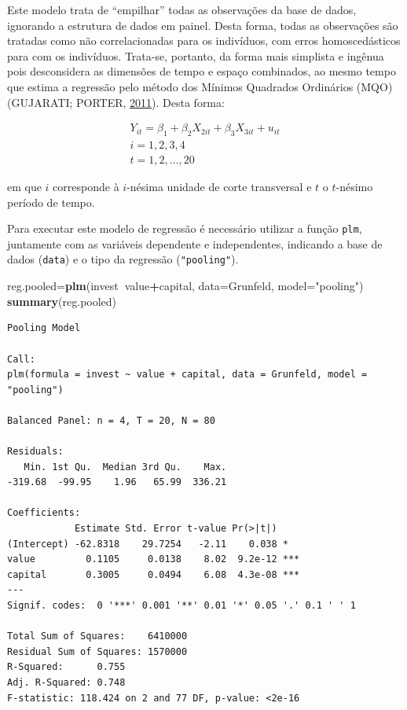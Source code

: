 \documentclass[12pt,brazil,oneside]{book}
\newenvironment{Shaded}{\begin{snugshade}}{\end{snugshade}}
\newcommand{\DataTypeTok}[1]{\textcolor[rgb]{0.13,0.29,0.53}{#1}}
\newcommand{\KeywordTok}[1]{\textcolor[rgb]{0.13,0.29,0.53}{\textbf{#1}}}
\newcommand{\NormalTok}[1]{#1}
\newcommand{\OperatorTok}[1]{\textcolor[rgb]{0.81,0.36,0.00}{\textbf{#1}}}
\newcommand{\StringTok}[1]{\textcolor[rgb]{0.31,0.60,0.02}{#1}}
\begin{document}
Este modelo trata de ``empilhar'' todas as observações da base de dados, ignorando a estrutura de dados em painel. Desta forma, todas as observações são tratadas como não correlacionadas para os indivíduos, com erros homoscedásticos para com os indivíduos. Trata-se, portanto, da forma mais simplista e ingênua pois desconsidera as dimensões de tempo e espaço combinados, ao mesmo tempo que estima a regressão pelo método dos Mínimos Quadrados Ordinários (MQO) (GUJARATI; PORTER, \protect\hyperlink{ref-Gujarati2011}{2011}). Desta forma:

\[
 \begin{matrix}
Y_{it} = \beta_1+\beta_2X_{2it} + \beta_3X_{3it} +u_{it}\\
i=1,2,3,4\\
t=1,2,\dots,20
 \end{matrix}
\]

em que \(i\) corresponde à \(i\)-nésima unidade de corte transversal e \(t\) o \(t\)-nésimo período de tempo.

Para executar este modelo de regressão é necessário utilizar a função \texttt{plm}, juntamente com as variáveis dependente e independentes, indicando a base de dados (\texttt{data}) e o tipo da regressão (\texttt{"pooling"}).

\begin{Shaded}
\begin{Highlighting}[]
\NormalTok{reg.pooled=}\KeywordTok{plm}\NormalTok{(invest}\OperatorTok{~}\NormalTok{value}\OperatorTok{+}\NormalTok{capital, }
               \DataTypeTok{data=}\NormalTok{Grunfeld, }\DataTypeTok{model=}\StringTok{"pooling"}\NormalTok{)}
\KeywordTok{summary}\NormalTok{(reg.pooled)}
\end{Highlighting}
\end{Shaded}

\begin{verbatim}
Pooling Model

Call:
plm(formula = invest ~ value + capital, data = Grunfeld, model = "pooling")

Balanced Panel: n = 4, T = 20, N = 80

Residuals:
   Min. 1st Qu.  Median 3rd Qu.    Max. 
-319.68  -99.95    1.96   65.99  336.21 

Coefficients:
            Estimate Std. Error t-value Pr(>|t|)    
(Intercept) -62.8318    29.7254   -2.11    0.038 *  
value         0.1105     0.0138    8.02  9.2e-12 ***
capital       0.3005     0.0494    6.08  4.3e-08 ***
---
Signif. codes:  0 '***' 0.001 '**' 0.01 '*' 0.05 '.' 0.1 ' ' 1

Total Sum of Squares:    6410000
Residual Sum of Squares: 1570000
R-Squared:      0.755
Adj. R-Squared: 0.748
F-statistic: 118.424 on 2 and 77 DF, p-value: <2e-16
\end{verbatim}
\end{document}
